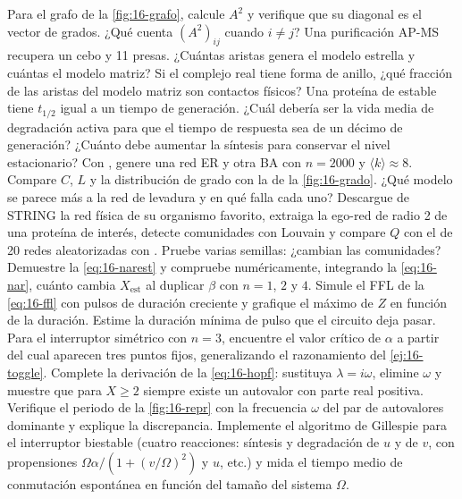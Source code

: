 \begin{ejercicios}
 Para el grafo de la \cref{fig:16-grafo}, calcule $A^2$ y verifique que su diagonal es el vector de grados. ¿Qué cuenta $(A^2)_{ij}$ cuando $i\neq j$?
 Una purificación AP-MS recupera un cebo y 11 presas. ¿Cuántas aristas genera el modelo estrella y cuántas el modelo matriz? Si el complejo real tiene forma de anillo, ¿qué fracción de las aristas del modelo matriz son contactos físicos?
 Una proteína de  estable tiene $t_{1/2}$ igual a un tiempo de generación. ¿Cuál debería ser la vida media de degradación activa para que el tiempo de respuesta sea de un décimo de generación? ¿Cuánto debe aumentar la síntesis para conservar el nivel estacionario?
 Con , genere una red ER y otra BA con $n=2000$ y $\langle k\rangle\approx8$. Compare $C$, $L$ y la distribución de grado con la de la \cref{fig:16-grado}. ¿Qué modelo se parece más a la red de levadura y en qué falla cada uno?
 Descargue de STRING la red física de su organismo favorito, extraiga la ego-red de radio 2 de una proteína de interés, detecte comunidades con Louvain y compare $Q$ con el de 20 redes aleatorizadas con . Pruebe varias semillas: ¿cambian las comunidades?
 Demuestre la \cref{eq:16-narest} y compruebe numéricamente, integrando la \cref{eq:16-nar}, cuánto cambia $X_{\text{est}}$ al duplicar $\beta$ con $n=1$, $2$ y $4$.
 Simule el FFL de la \cref{eq:16-ffl} con pulsos de duración creciente y grafique el máximo de $Z$ en función de la duración. Estime la duración mínima de pulso que el circuito deja pasar.
 Para el interruptor simétrico con $n=3$, encuentre el valor crítico de $\alpha$ a partir del cual aparecen tres puntos fijos, generalizando el razonamiento del \cref{ej:16-toggle}.
 Complete la derivación de la \cref{eq:16-hopf}: sustituya $\lambda=i\omega$, elimine $\omega$ y muestre que para $X\ge2$ siempre existe un autovalor con parte real positiva. Verifique el periodo de la \cref{fig:16-repr} con la frecuencia $\omega$ del par de autovalores dominante y explique la discrepancia.
 Implemente el algoritmo de Gillespie para el interruptor biestable (cuatro reacciones: síntesis y degradación de $u$ y de $v$, con propensiones $\Omega\alpha/(1+(v/\Omega)^2)$ y $u$, etc.) y mida el tiempo medio de conmutación espontánea en función del tamaño del sistema $\Omega$.
\end{ejercicios}

